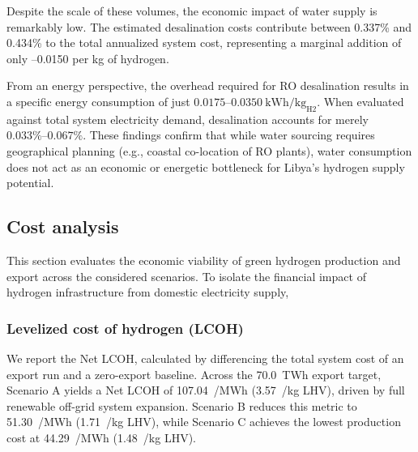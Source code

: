 \documentclass[preprint,12pt]{elsarticle}
\begin{document}
Despite the scale of these volumes, the economic impact of water supply is remarkably low. The estimated desalination costs contribute between 0.337\% and 0.434\% to the total annualized system cost, representing a marginal addition of only --0.0150 per kg of hydrogen. 

From an energy perspective, the overhead required for RO desalination results in a specific energy consumption of just $0.0175\text{--}0.0350~\text{kWh/kg}_{\text{H2}}$. When evaluated against total system electricity demand, desalination accounts for merely $0.033\%\text{--}0.067\%$. These findings confirm that while water sourcing requires geographical planning (e.g., coastal co-location of RO plants), water consumption does not act as an economic or energetic bottleneck for Libya's hydrogen supply potential.


\subsection{Cost analysis}
This section evaluates the economic viability of green hydrogen production and export across the considered scenarios. To isolate the financial impact of hydrogen infrastructure from domestic electricity supply,

\subsubsection{Levelized cost of hydrogen (LCOH)}
We report the Net LCOH, calculated by differencing the total system cost of an export run and a zero-export baseline. Across the 70.0~TWh export target, Scenario A yields a Net LCOH of 107.04~\texteuro/MWh (3.57~\texteuro/kg LHV), driven by full renewable off-grid system expansion. Scenario B reduces this metric to 51.30~\texteuro/MWh (1.71~\texteuro/kg LHV), while Scenario C achieves the lowest production cost at 44.29~\texteuro/MWh (1.48~\texteuro/kg LHV).
\end{document}
